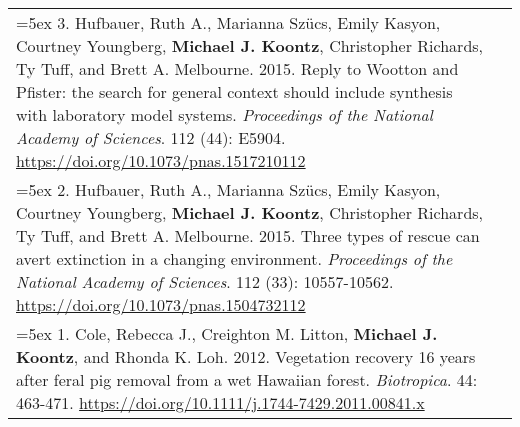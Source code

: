 \begin{longtable}{@{} >{\raggedright}p{6.10in} >{\raggedleft}X @{}}
\hangindent=5ex 3. Hufbauer, Ruth A., Marianna Sz\"ucs, Emily Kasyon, Courtney Youngberg, \textbf{Michael J. Koontz}, Christopher Richards, Ty Tuff, and Brett A. Melbourne. 2015. Reply to Wootton and Pfister: the search for general context should include synthesis with laboratory model systems. \emph{Proceedings of the National Academy of Sciences}. 112 (44): E5904. \href{https://doi.org/10.1073/pnas.1517210112}{https://doi.org/10.1073/pnas.1517210112} & \tabularnewline

\hangindent=5ex 2. Hufbauer, Ruth A., Marianna Sz\"ucs, Emily Kasyon, Courtney Youngberg, \textbf{Michael J. Koontz}, Christopher Richards, Ty Tuff, and Brett A. Melbourne. 2015. Three types of rescue can avert extinction in a changing environment. \emph{Proceedings of the National Academy of Sciences}. 112 (33): 10557-10562. \href{https://doi.org/10.1073/pnas.1504732112}{https://doi.org/10.1073/pnas.1504732112} &  \tabularnewline

\hangindent=5ex 1. Cole, Rebecca J., Creighton M. Litton, \textbf{Michael J. Koontz}, and Rhonda K. Loh. 2012. Vegetation recovery 16 years after feral pig removal from a wet Hawaiian forest. \emph{Biotropica}. 44: 463-471. \href{https://doi.org/10.1111/j.1744-7429.2011.00841.x}{https://doi.org/10.1111/j.1744-7429.2011.00841.x} &  \tabularnewline

\end{longtable}
